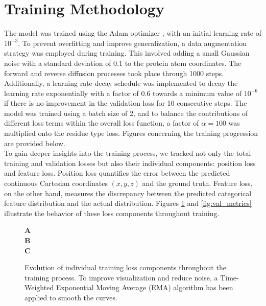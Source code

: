 \section{Training Methodology}
The model was trained using the Adam optimizer \cite{kingma2014adam}, with an initial learning rate of $10^{-3}$. To prevent overfitting and improve generalization, a data augmentation strategy was employed during training. This involved adding a small Gaussian noise with a standard deviation of 0.1 to the protein atom coordinates. The forward and reverse diffusion processes took place through 1000 steps. Additionally, a learning rate decay schedule was implemented to decay the learning rate exponentially with a factor of 0.6 towards a minimum value of $10^{-6}$ if there is no improvement in the validation loss for 10 consecutive steps. The model was trained using a batch size of 2, and to balance the contributions of different loss terms within the overall loss function, a factor of $\alpha = 100$ was multiplied onto the residue type loss. Figures concerning the training progression are provided below. \\

To gain deeper insights into the training process, we tracked not only the total training and validation losses but also their individual components: position loss and feature loss. Position loss quantifies the error between the predicted continuous Cartesian coordinates $(x, y, z)$ and the ground truth. Feature loss, on the other hand, measures the discrepancy between the predicted categorical feature distribution and the actual distribution. Figures \ref{fig:train_metrics} and \ref{fig:val_metrics} illustrate the behavior of these loss components throughout training. \\

\begin{figure}
  \center

  \textbf{\Large A}
   \\

  \textbf{\Large B}
   \\

  \textbf{\Large C}

  \caption{Evolution of individual training loss components throughout the training process. To improve visualization and reduce noise, a Time-Weighted Exponential Moving Average (EMA) algorithm has been applied to smooth the curves.}

  \label{fig:train_metrics}
\end{figure}


